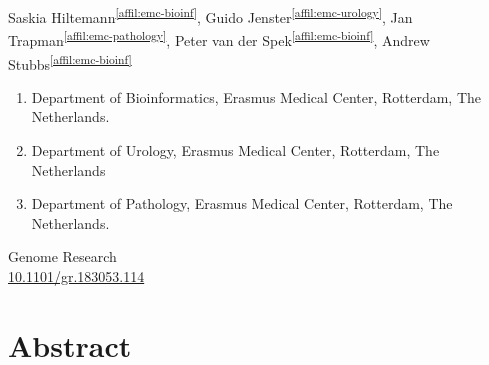 \setcounter{NAT@ctr}{-1}

{}
Saskia Hiltemann\textsuperscript{\ref{affil:emc-bioinf}},
Guido Jenster\textsuperscript{\ref{affil:emc-urology}},
Jan Trapman\textsuperscript{\ref{affil:emc-pathology}},
Peter van der Spek\textsuperscript{\ref{affil:emc-bioinf}},
Andrew Stubbs\textsuperscript{\ref{affil:emc-bioinf}}

\small
\begin{enumerate}
\itemsep-0.5em
\item Department of Bioinformatics, Erasmus Medical Center, Rotterdam, The Netherlands. \label{affil:emc-bioinf}
\item Department of Urology, Erasmus Medical Center, Rotterdam, The Netherlands \label{affil:emc-urology}
\item Department of Pathology, Erasmus Medical Center, Rotterdam, The Netherlands. \label{affil:emc-pathology}
\end{enumerate}

{\color{chaptergrey}{Published in:}} Genome Research \\
{\color{chaptergrey}{DOI:}} \hyperref[https://doi.org/10.1101/gr.183053.114]{10.1101/gr.183053.114}

\normalsize

\section*{Abstract}

